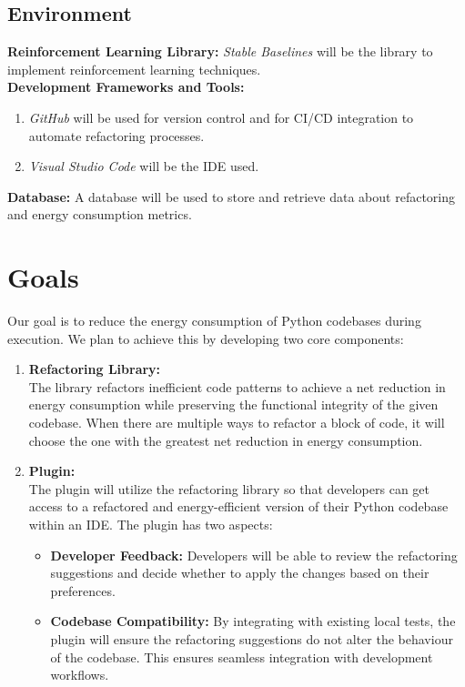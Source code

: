 \documentclass{article}
\begin{document}
\subsection{Environment}
\textbf{Reinforcement Learning Library:} \textit{Stable Baselines} will be the library to implement reinforcement learning techniques.\\
\textbf{Development Frameworks and Tools:} 
\begin{enumerate}

    \item \textit{GitHub} will be used for version control and for CI/CD integration to automate refactoring processes.
    \item \textit{Visual Studio Code} will be the IDE used.
    
\end{enumerate} 
\textbf{Database:} A database will be used to store and retrieve data about refactoring and energy consumption metrics.

\section{Goals}

Our goal is to reduce the energy consumption of Python codebases during execution. We plan to achieve this by developing two core components:

\begin{enumerate}
    \item \textbf{Refactoring Library:} \\
    The library refactors inefficient code patterns to achieve a net reduction in energy consumption while preserving the functional integrity of the given codebase. When there are multiple ways to refactor a block of code, it will choose the one with the greatest net reduction in energy consumption.

    \item \textbf{Plugin:} \\
    The plugin will utilize the refactoring library so that developers can get access to a refactored and energy-efficient version of their Python codebase within an IDE. The plugin has two aspects:

    \begin{itemize}
        \item \textbf{Developer Feedback:} Developers will be able to review the refactoring suggestions and decide whether to apply the changes based on their preferences.
        \item \textbf{Codebase Compatibility:} By integrating with existing local tests, the plugin will ensure the refactoring suggestions do not alter the behaviour of the codebase. This ensures seamless integration with development workflows.
    \end{itemize}
\end{enumerate}
\end{document}
